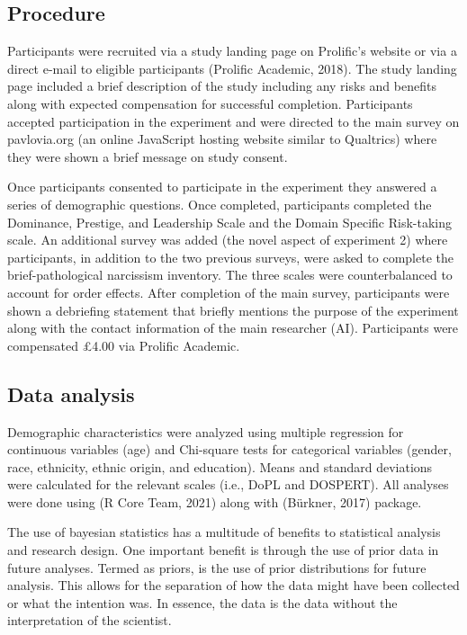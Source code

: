 \documentclass[
  donotrepeattitle,doc, 12pt, a4paper,floatsintext]{apa7}
\begin{document}
\hypertarget{procedure-1}{%
\subsection{Procedure}\label{procedure-1}}

Participants were recruited via a study landing page on Prolific's website or via a direct e-mail to eligible participants (Prolific Academic, 2018). The study landing page included a brief description of the study including any risks and benefits along with expected compensation for successful completion. Participants accepted participation in the experiment and were directed to the main survey on pavlovia.org (an online JavaScript hosting website similar to Qualtrics) where they were shown a brief message on study consent.

Once participants consented to participate in the experiment they answered a series of demographic questions. Once completed, participants completed the Dominance, Prestige, and Leadership Scale and the Domain Specific Risk-taking scale. An additional survey was added (the novel aspect of experiment 2) where participants, in addition to the two previous surveys, were asked to complete the brief-pathological narcissism inventory. The three scales were counterbalanced to account for order effects. After completion of the main survey, participants were shown a debriefing statement that briefly mentions the purpose of the experiment along with the contact information of the main researcher (AI). Participants were compensated £4.00 via Prolific Academic.

\hypertarget{data-analysis-1}{%
\subsection{Data analysis}\label{data-analysis-1}}

Demographic characteristics were analyzed using multiple regression for continuous variables (age) and Chi-square tests for categorical variables (gender, race, ethnicity, ethnic origin, and education). Means and standard deviations were calculated for the relevant scales (i.e., DoPL and DOSPERT). All analyses were done using (R Core Team, 2021) along with (Bürkner, 2017) package.

The use of bayesian statistics has a multitude of benefits to statistical analysis and research design. One important benefit is through the use of prior data in future analyses. Termed as priors, is the use of prior distributions for future analysis. This allows for the separation of how the data might have been collected or what the intention was. In essence, the data is the data without the interpretation of the scientist.
\end{document}
